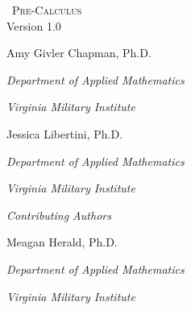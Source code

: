 
\hskip 125pt\begin{minipage}{\textwidth}
\begin{flushright}

\textsc{\large \apex\ {\Huge Pre-Calculus}} \\

{\small Version 1.0}\\

\Large
\vspace{1in}

Amy Givler Chapman, Ph.D.

\emph{\small Department of Applied Mathematics}

\emph{\small Virginia Military Institute}\vskip15pt

Jessica Libertini, Ph.D.

\emph{\small Department of Applied Mathematics}

\emph{\small Virginia Military Institute}\vskip15pt


\parbox{200pt}{\textit{Contributing Authors}}\hskip 2cm \phantom{.}

Meagan Herald, Ph.D.

\emph{\small Department of Applied Mathematics}

\emph{\small Virginia Military Institute}\vskip 15pt

%
%
%
%
%
%
%
%
%

\normalsize
\end{flushright}
\end{minipage}

